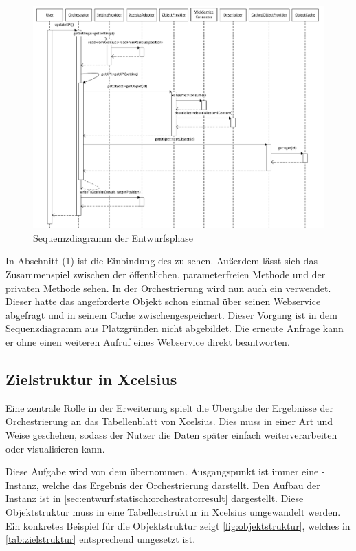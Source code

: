 \begin{onehalfspacing}
\begin{figure}[h]
\centering
\setlength{\unitlength}{1mm}
\includegraphics[width=15cm]{Visio/Entwurf-Sequenz.pdf}
\caption{Sequemzdiagramm der Entwurfsphase\label{fig:sequenz_entwurf}}
\end{figure}

In Abschnitt (1) ist die Einbindung des  zu sehen. Außerdem lässt sich das Zusammenspiel zwischen der öffentlichen, parameterfreien Methode  und der privaten Methode  sehen. In der Orchestrierung wird nun auch ein  verwendet. Dieser hatte das angeforderte Objekt schon einmal über seinen Webservice abgefragt und in seinem Cache zwischengespeichert. Dieser Vorgang ist in dem Sequenzdiagramm aus Platzgründen nicht abgebildet. Die erneute Anfrage kann er ohne einen weiteren Aufruf eines Webservice direkt beantworten.

\subsection{Zielstruktur in Xcelsius}
Eine zentrale Rolle in der Erweiterung spielt die Übergabe der Ergebnisse der Orchestrierung an das Tabellenblatt von Xcelsius. Dies muss in einer Art und Weise geschehen, sodass der Nutzer die Daten später einfach weiterverarbeiten oder visualisieren kann.

Diese Aufgabe wird von dem  übernommen. Ausgangspunkt ist immer eine -Instanz, welche das Ergebnis der Orchestrierung darstellt. Den Aufbau der Instanz ist in \vref{sec:entwurf:statisch:orchestratorresult} dargestellt. Diese Objektstruktur muss in eine Tabellenstruktur in Xcelsius umgewandelt werden. Ein konkretes Beispiel für die Objektstruktur zeigt \vref{fig:objektstruktur}, welches in \vref{tab:zielstruktur} entsprechend umgesetzt ist.


\end{onehalfspacing}
